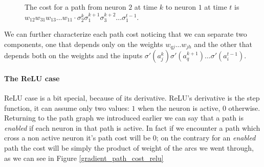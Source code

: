 \begin{figure}
\caption{The cost for a path from neuron $2$ at time $k$ to neuron $1$ at time $t$ is $w_{12}w_{31}w_{13}\hdots w_{11}\cdot \sigma_2^k \sigma_1^{k+1}\sigma_3^{k+2} \hdots \sigma_1^{t-1}$. }
\label{gradient_path_cost}
\end{figure}


We can further characterize each path cost noticing that we can separate two components, one that depends only on the weights $w_{qj} \hdots w_{jh}$ and the other that depends both on the weights and the inputs
$\sigma'(a_j^k)\sigma'(a_q^{k+1}) \hdots \sigma'(a_i^{t-1})$.


\paragraph{The ReLU case}
ReLU case is a bit special, because of its derivative.
ReLU's derivative is the step function, it can assume only two values: $1$ when the neuron is active, $0$ otherwise.
Returning to the path graph we introduced earlier we can say that a path is \textit{enabled} if each neuron in that path is active. In fact if we
encounter a path which cross a non active neuron it's path cost will be 0; on the contrary for an \textit{enabled} path the cost will be simply the product
of weight of the arcs we went through, as we can see in Figure \ref{gradient_path_cost_relu}


